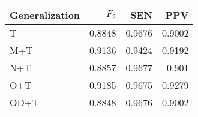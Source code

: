 \begin{table}[htbp]
  \caption{}
  \label{tab:}
  \centering
  \begin{tabular}[h]{@{}lrrr@{}}
    \toprule
    Generalization & \(F_2\) & SEN & PPV \\
    \midrule
T	&	0.8848	&	0.9676	&	0.9002 \\
M+T	&	0.9136	&	0.9424	&	0.9192 \\
N+T	&	0.8857	&	0.9677	&	0.901 \\
O+T	&	0.9185	&	0.9675	&	0.9279 \\
OD+T	&	0.8848	&	0.9676	&	0.9002 \\
    \bottomrule
  \end{tabular}
\end{table}
